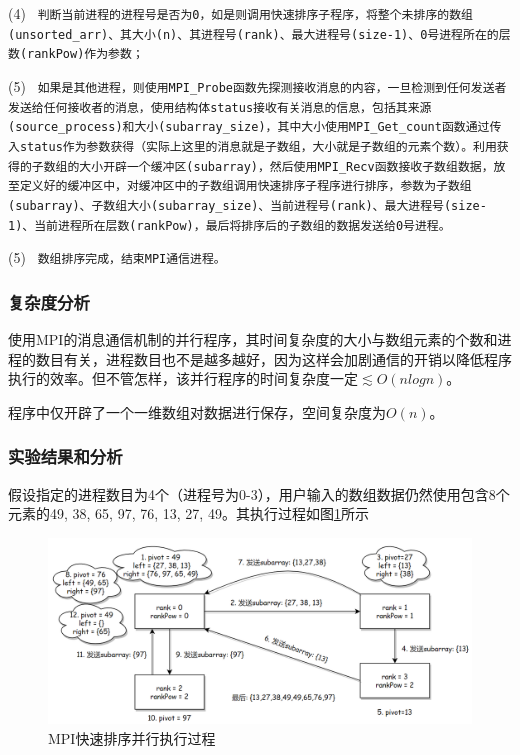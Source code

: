 \documentclass[supercite]{Experimental_Report}
\theoremstyle{definition}
\begin{document}
(4) \texttt{ 判断当前进程的进程号是否为0，如是则调用快速排序子程序，将整个未排序的数组(unsorted\_arr)、其大小(n)、其进程号(rank)、最大进程号(size-1)、0号进程所在的层数(rankPow)作为参数；}

(5) \texttt{ 如果是其他进程，则使用MPI\_Probe函数先探测接收消息的内容，一旦检测到任何发送者发送给任何接收者的消息，使用结构体status接收有关消息的信息，包括其来源(source\_process)和大小(subarray\_size)，其中大小使用MPI\_Get\_count函数通过传入status作为参数获得（实际上这里的消息就是子数组，大小就是子数组的元素个数）。利用获得的子数组的大小开辟一个缓冲区(subarray)，然后使用MPI\_Recv函数接收子数组数据，放至定义好的缓冲区中，对缓冲区中的子数组调用快速排序子程序进行排序，参数为子数组(subarray)、子数组大小(subarray\_size)、当前进程号(rank)、最大进程号(size-1)、当前进程所在层数(rankPow)，最后将排序后的子数组的数据发送给0号进程。}

(5) \texttt{ 数组排序完成，结束MPI通信进程。}



\subsubsection{复杂度分析}
使用MPI的消息通信机制的并行程序，其时间复杂度的大小与数组元素的个数和进程的数目有关，进程数目也不是越多越好，因为这样会加剧通信的开销以降低程序执行的效率。但不管怎样，该并行程序的时间复杂度一定$\lesssim O(nlogn)$。

程序中仅开辟了一个一维数组对数据进行保存，空间复杂度为$O(n)$。
\subsubsection{实验结果和分析}
假设指定的进程数目为4个（进程号为0-3），用户输入的数组数据仍然使用包含8个元素的49, 38, 65, 97, 76, 13, 27, 49。其执行过程如图\ref{fig:p2}所示

\begin{figure}[ht]
\centering
\includegraphics[scale=0.6]{MPI_quick_sort.png}
\caption{MPI快速排序并行执行过程}
\label{fig:p2}
\end{figure}
\end{document}
